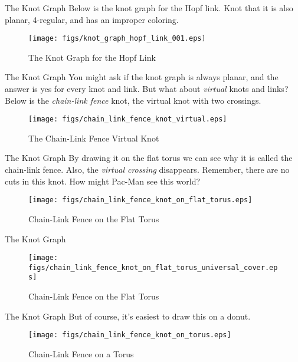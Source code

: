\documentclass{beamer}
\begin{document}
    \begin{frame}{The Knot Graph}
        Below is the knot graph for the Hopf link. Knot that it is also
        planar, 4-regular, and has an improper coloring.
        \begin{figure}
            \centering
            \texttt{[image: figs/knot\_graph\_hopf\_link\_001.eps]}
            \caption{The Knot Graph for the Hopf Link}
            \label{fig:knot_graph_hopf}
        \end{figure}
    \end{frame}
    \begin{frame}{The Knot Graph}
        You might ask if the knot graph is always planar, and the answer is yes for
        every knot and link. But what about \textit{virtual} knots and links?
        Below is the \textit{chain-link fence} knot, the virtual knot with two crossings.
        \begin{figure}
            \centering
            \texttt{[image: figs/chain\_link\_fence\_knot\_virtual.eps]}
            \caption{The Chain-Link Fence Virtual Knot}
            \label{fig:chain_link_fence_virtual}
        \end{figure}
    \end{frame}
    \begin{frame}{The Knot Graph}
        By drawing it on the flat torus we can see why it is called the
        chain-link fence. Also, the \textit{virtual crossing} disappears.
        Remember, there are no cuts in this knot. How might Pac-Man see this world?
        \begin{figure}
            \centering
            \texttt{[image: figs/chain\_link\_fence\_knot\_on\_flat\_torus.eps]}
            \caption{Chain-Link Fence on the Flat Torus}
            \label{fig:chain_link_fence_flat_torus}
        \end{figure}
    \end{frame}
    \begin{frame}{The Knot Graph}
        \begin{figure}
            \centering
            \texttt{[image: figs/chain\_link\_fence\_knot\_on\_flat\_torus\_universal\_cover.eps]}
            \caption{Chain-Link Fence on the Flat Torus}
            \label{fig:chain_link_fence_flat_torus_plane}
        \end{figure}
    \end{frame}
    \begin{frame}{The Knot Graph}
        But of course, it's easiest to draw this on a donut.
        \begin{figure}
            \centering
            \texttt{[image: figs/chain\_link\_fence\_knot\_on\_torus.eps]}
            \caption{Chain-Link Fence on a Torus}
            \label{fig:chain_link_fence_on_torus}
        \end{figure}
    \end{frame}
\end{document}
